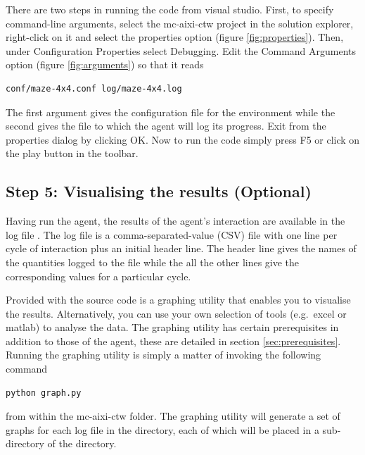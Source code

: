 \documentclass[a4paper,11pt]{article}
\begin{document}
There are two steps in running the code from visual studio. First, to specify command-line arguments, select the mc-aixi-ctw project in the solution explorer, right-click on it and select the properties option (figure \ref{fig:properties}). Then, under Configuration Properties select Debugging. Edit the Command Arguments option (figure \ref{fig:arguments}) so that it reads
\begin{lstlisting}[frame=single]
conf/maze-4x4.conf log/maze-4x4.log
\end{lstlisting}
The first argument gives the configuration file for the environment while the second gives the file to which the agent will log its progress. Exit from the properties dialog by clicking OK. Now to run the code simply press F5 or click on the play button in the toolbar.





\subsection{Step 5: Visualising the results (Optional)}
Having run the agent, the results of the agent's interaction are available in the log file . The log file is a comma-separated-value (CSV) file with one line per cycle of interaction plus an initial header line. The header line gives the names of the quantities logged to the file while the all the other lines give the corresponding values for a particular cycle. 

Provided with the source code is a graphing utility that enables you to visualise the results. Alternatively, you can use your own selection of tools (e.g.~excel or matlab) to analyse the data. The graphing utility has certain prerequisites in addition to those of the agent, these are detailed in section \ref{sec:prerequisites}. Running the graphing utility is simply a matter of invoking the following command
\begin{lstlisting}[frame=single]
python graph.py
\end{lstlisting}
from within the mc-aixi-ctw folder. The graphing utility will generate a set of graphs for each log file in the  directory, each of which will be placed in a sub-directory of the  directory. 
\end{document}
